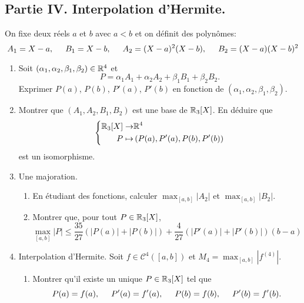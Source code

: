 \subsection*{Partie IV. Interpolation d'Hermite.}
On fixe deux réels $a$ et $b$ avec $a<b$ et on définit des polynômes:
\begin{displaymath}
A_1 = X-a, \hspace{0.5cm} B_1 = X-b,\hspace{0.5cm} A_2 = (X-a)^2(X-b),\hspace{0.5cm} B_2 = (X-a)(X-b)^2 
\end{displaymath}
\begin{enumerate}  
  \item Soit $(\alpha_1,\alpha_2, \beta_1, \beta_2)\in \mathbb{R}^4$ et 
\begin{displaymath}
  P = \alpha_1 A_1 + \alpha_2 A_2 + \beta_1 B_1 + \beta_2 B_2.
\end{displaymath}
Exprimer $P(a)$, $P(b)$, $P'(a)$, $P'(b)$ en fonction de $(\alpha_1,\alpha_2, \beta_1, \beta_2)$.

  \item Montrer que $(A_1,A_2,B_1,B_2)$ est une base de $\mathbb{R}_3[X]$. En déduire que 
\begin{displaymath}
  \left\lbrace 
  \begin{aligned}
    \mathbb{R}_3[X] \rightarrow& \mathbb{R}^4 \\ P \mapsto& 
    \left( P(a), P'(a), P(b), P'(b)\right) 
  \end{aligned}
\right. 
\end{displaymath}
est un isomorphisme.

  \item Une majoration.
\begin{enumerate}
  \item En étudiant des fonctions, calculer $\max_{[a,b]}|A_2|$ et $\max_{[a,b]}|B_2|$.
  \item Montrer que, pour tout $P\in \mathbb{R}_3[X]$,
\begin{displaymath}
  \max_{[a,b]}|P| \leq \frac{35}{27}\left(|P(a)|+|P(b)| \right) + \frac{4}{27}\left(|P'(a)|+|P'(b)| \right)(b-a)
\end{displaymath}
\end{enumerate}

  \item Interpolation d'Hermite. Soit $f\in \mathcal{C}^4([a,b])$ et $M_4 = \max_{[a,b]}\left|f^{(4)}\right|$. 
\begin{enumerate}
  \item Montrer qu'il existe un unique $P\in \mathbb{R}_3[X]$ tel que 
\begin{displaymath}
  P(a)=f(a),\hspace{0.5cm} P'(a)=f'(a),\hspace{0.5cm} P(b)=f(b),\hspace{0.5cm} P'(b)=f'(b).
\end{displaymath}


\end{enumerate}
\end{enumerate}
